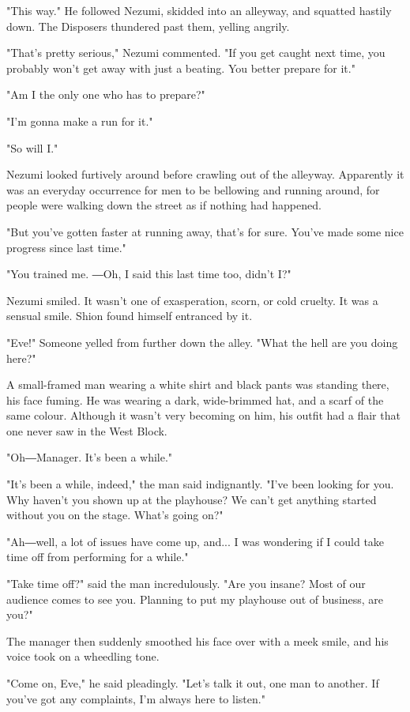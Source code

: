 "This way." He followed Nezumi, skidded into an alleyway, and squatted
hastily down. The Disposers thundered past them, yelling angrily.

"That's pretty serious," Nezumi commented. "If you get caught next time,
you probably won't get away with just a beating. You better prepare for
it."

"Am I the only one who has to prepare?"

"I'm gonna make a run for it."

"So will I."

Nezumi looked furtively around before crawling out of the alleyway.
Apparently it was an everyday occurrence for men to be bellowing and
running around, for people were walking down the street as if nothing
had happened.

"But you've gotten faster at running away, that's for sure. You've made
some nice progress since last time."

"You trained me. ―Oh, I said this last time too, didn't I?"

Nezumi smiled. It wasn't one of exasperation, scorn, or cold cruelty. It
was a sensual smile. Shion found himself entranced by it.

"Eve!" Someone yelled from further down the alley. "What the hell are
you doing here?"

A small-framed man wearing a white shirt and black pants was standing
there, his face fuming. He was wearing a dark, wide-brimmed hat, and a
scarf of the same colour. Although it wasn't very becoming on him, his
outfit had a flair that one never saw in the West Block.

"Oh―Manager. It's been a while."

"It's been a while, indeed," the man said indignantly. "I've been
looking for you. Why haven't you shown up at the playhouse? We can't get
anything started without you on the stage. What's going on?"

"Ah―well, a lot of issues have come up, and... I was wondering if I
could take time off from performing for a while."

"Take time off?" said the man incredulously. "Are you insane? Most of
our audience comes to see you. Planning to put my playhouse out of
business, are you?"

The manager then suddenly smoothed his face over with a meek smile, and
his voice took on a wheedling tone.

"Come on, Eve," he said pleadingly. "Let's talk it out, one man to
another. If you've got any complaints, I'm always here to listen."

